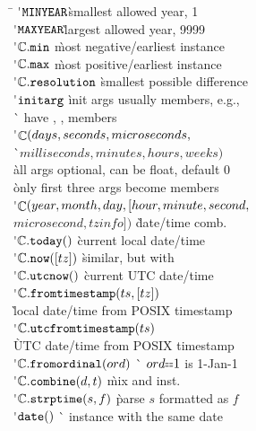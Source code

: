 
\begin{tabbing}
\hspace{2em}\= \kill
\'$\mathtt{MINYEAR}$\` smallest allowed year, 1 \\
\'$\mathtt{MAXYEAR}$\` largest allowed year, 9999 \\
\'$\mathtt{\mathbb{C}.min}$ \` most negative/earliest instance \\
\'$\mathtt{\mathbb{C}.max}$ \` most positive/earliest instance \\
\'$\mathtt{\mathbb{C}.resolution}$ \` smallest possible difference \\
\'$\mathtt{initarg}$ \` init args usually members, e.g., \\ \`  have , ,  members \\
\'$\mathop{\mathtt{\mathbb{C}}}(days, seconds, microseconds,$\\ \`$milliseconds, minutes, hours, weeks)$\\ \`all args optional, can be float, default 0 \\ \` only first three args become members \\
\'$\mathop{\mathtt{\mathbb{C}}}(year, month, day, {[}hour, minute, second, $\\
\>$microsecond,\! tzin\!f\!o{]})$ \` date$\!$/$\!$time comb. \\
\'$\mathop{\mathtt{\mathbb{C}.today}}()$ \` current local date/time \\
\'$\mathop{\mathtt{\mathbb{C}.now}}({[}{tz}{]})$ \` similar, but with  \\
\'$\mathop{\mathtt{\mathbb{C}.utcnow}}()$ \` current UTC date/time \\
\'$\mathop{\mathtt{\mathbb{C}.fromtimestamp}}(ts, {[}{tz}{]})$ \\ \` local date/time from POSIX timestamp \\
\'$\mathop{\mathtt{\mathbb{C}.utcfromtimestamp}}(ts)$ \\ \` UTC date/time from POSIX timestamp \\
\'$\mathop{\mathtt{\mathbb{C}.fromordinal}}(ord)$ \` $ord\eq 1$ is 1-Jan-1 \\
\'$\mathop{\mathtt{\mathbb{C}.combine}}(d, t)$ \` mix  and  inst. \\
\'$\mathop{\mathtt{\mathbb{C}.strptime}}(s, f)$ \` parse $s$ formatted as $f$ \\
\'$\mathop{\mathtt{date}}()$ \`  instance with the same date \\

\end{tabbing}

